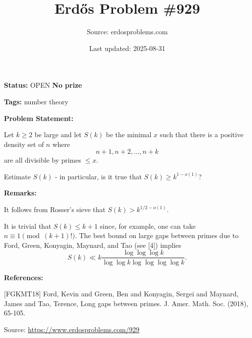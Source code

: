 \documentclass{article}
\title{Erd\H{o}s Problem \#929}
\date{Last updated: 2025-08-31}
\author{Source: erdosproblems.com}
\begin{document}
\maketitle

\noindent\textbf{Status:} OPEN \quad \textbf{No prize}

\noindent\textbf{Tags:} number theory

\medskip
\noindent\textbf{Problem Statement:}

Let $k\geq 2$ be large and let $S(k)$ be the minimal $x$ such that there is a positive density set of $n$ where\[n+1,n+2,\ldots,n+k\]are all divisible by primes $\leq x$.

Estimate $S(k)$ - in particular, is it true that $S(k)\geq k^{1-o(1)}$?

\bigskip
\noindent\textbf{Remarks:}

It follows from Rosser's sieve that $S(k)> k^{1/2-o(1)}$.

It is trivial that $S(k)\leq k+1$ since, for example, one can take $n\equiv 1\pmod{(k+1)!}$. The best bound on large gaps between primes due to Ford, Green, Konyagin, Maynard, and Tao \cite{FGKMT18} (see [4]) implies\[S(k) \ll k \frac{\log\log\log k}{\log\log k\log\log\log\log k}.\]

\bigskip
\noindent\textbf{References:}

[FGKMT18] Ford, Kevin and Green, Ben and Konyagin, Sergei and Maynard, James and Tao, Terence, Long gaps between primes. J. Amer. Math. Soc. (2018), 65-105.

\bigskip
\noindent\small{Source: \url{https://www.erdosproblems.com/929}}
\end{document}
